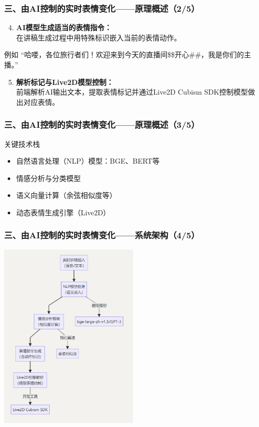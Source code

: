 \documentclass{beamer}
\begin{document}
\begin{frame}
    \frametitle{三、由AI控制的实时表情变化——原理概述（2/5）}
    \begin{enumerate}
        \setcounter{enumi}{3} %
        \item \textbf{AI模型生成适当的表情指令：} \\
              在讲稿生成过程中用特殊标识嵌入当前的表情动作。
    \end{enumerate}
    \begin{exampleblock}{例如}
        “哈喽，各位旅行者们！欢迎来到今天的直播间\$\$开心\#\#，我是你们的主播。”
    \end{exampleblock}
    \vspace{0.5cm}
    \begin{enumerate}
        \setcounter{enumi}{4} %
        \item \textbf{解析标记与Live2D模型控制：} \\ 前端解析AI输出文本，提取表情标记并通过Live2D Cubism SDK控制模型做出对应表情。
    \end{enumerate}
\end{frame}

\begin{frame}
    \frametitle{三、由AI控制的实时表情变化——原理概述（3/5）}


    \begin{block}{关键技术栈}
        \begin{itemize}
            \item 自然语言处理（NLP）模型：BGE、BERT等
            \item 情感分析与分类模型
            \item 语义向量计算（余弦相似度等）
            \item 动态表情生成引擎（Live2D）
        \end{itemize}
    \end{block}
\end{frame}

\begin{frame}
    \frametitle{三、由AI控制的实时表情变化——系统架构（4/5）}
    \centering
    \includegraphics[width=0.5\textwidth]{pic/语义控制表情.png}

\end{frame}
\end{document}
